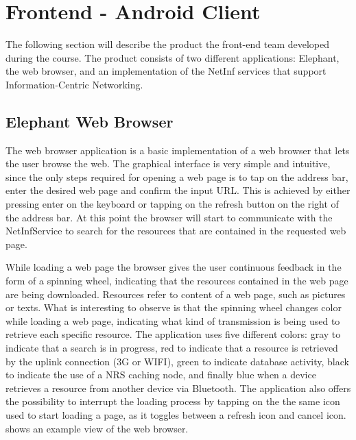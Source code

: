 \section {Frontend - Android Client}
The following section will describe the product the front-end team developed during the course.
The product consists of two different applications: Elephant, the web browser, and an implementation
of the NetInf services that support Information-Centric Networking.

\subsection{Elephant Web Browser}
The web browser application is a basic implementation of a web browser that lets the user browse
the web. The graphical interface is very simple and intuitive, since the only steps required for
opening a web page is to tap on the address bar, enter the desired web page and confirm the input URL.
This is achieved by either pressing enter on the keyboard or tapping on the refresh button on the right
of the address bar. At this point the browser will start to communicate with the NetInfService to
search for the resources that are contained in the requested web page.

While loading a web page the browser gives the user continuous feedback in the form of a spinning wheel,
indicating that the resources contained in the web page are being downloaded.
Resources refer to content of a web page, such as pictures or texts.
What is interesting to observe is that the spinning wheel changes color while loading a web page,
indicating what kind of transmission is being used to retrieve each specific resource.
The application uses five different colors: gray to indicate that a search is in progress, red to indicate
that a resource is retrieved by the uplink connection (3G or WIFI), green to indicate database activity,
black to indicate the use of a NRS caching node, and finally blue when a device retrieves a resource from
another device via Bluetooth. The application also offers the possibility to interrupt the
loading process by tapping on the the same icon used to start loading a page, as it toggles between a refresh
icon and cancel icon.  shows an example view of the web browser.\\

